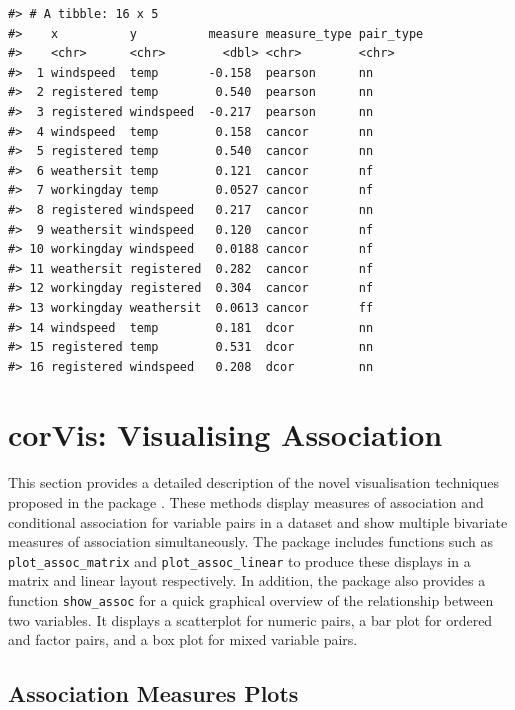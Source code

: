 \begin{verbatim}
#> # A tibble: 16 x 5
#>    x          y          measure measure_type pair_type
#>    <chr>      <chr>        <dbl> <chr>        <chr>    
#>  1 windspeed  temp       -0.158  pearson      nn       
#>  2 registered temp        0.540  pearson      nn       
#>  3 registered windspeed  -0.217  pearson      nn       
#>  4 windspeed  temp        0.158  cancor       nn       
#>  5 registered temp        0.540  cancor       nn       
#>  6 weathersit temp        0.121  cancor       nf       
#>  7 workingday temp        0.0527 cancor       nf       
#>  8 registered windspeed   0.217  cancor       nn       
#>  9 weathersit windspeed   0.120  cancor       nf       
#> 10 workingday windspeed   0.0188 cancor       nf       
#> 11 weathersit registered  0.282  cancor       nf       
#> 12 workingday registered  0.304  cancor       nf       
#> 13 workingday weathersit  0.0613 cancor       ff       
#> 14 windspeed  temp        0.181  dcor         nn       
#> 15 registered temp        0.531  dcor         nn       
#> 16 registered windspeed   0.208  dcor         nn
\end{verbatim}

\hypertarget{corvis-visualising-association}{%
\section{corVis: Visualising Association}\label{corvis-visualising-association}}

This section provides a detailed description of the novel visualisation techniques proposed in the package . These methods display measures of association and conditional association for variable pairs in a dataset and show multiple bivariate measures of association simultaneously. The package includes functions such as \texttt{plot\_assoc\_matrix} and \texttt{plot\_assoc\_linear} to produce these displays in a matrix and linear layout respectively. In addition, the package also provides a function \texttt{show\_assoc} for a quick graphical overview of the relationship between two variables. It displays a scatterplot for numeric pairs, a bar plot for ordered and factor pairs, and a box plot for mixed variable pairs.

\hypertarget{association-measures-plots}{%
\subsection{Association Measures Plots}\label{association-measures-plots}}

